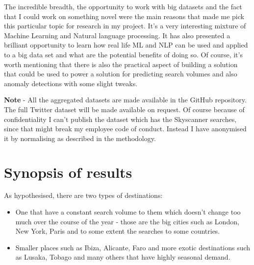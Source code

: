 \documentclass[minf,frontabs,twoside,singlespacing,parskip]{infthesis}
\begin{document}
The incredible breadth, the opportunity to work with big datasets and the fact that I could work on something novel were the main reasons that made me pick this particular topic for research in my project. It's a very interesting mixture of Machine Learning and Natural language processing. It has also presented a brilliant opportunity to learn how real life ML and NLP can be used and applied to a big data set and what are the potential benefits of doing so. Of course, it's worth mentioning that there is also the practical aspect of building a solution that could be used to power a solution for predicting search volumes and also anomaly detections with some slight tweaks. 


\textbf{Note} - All the aggregated datasets are made available in the GitHub repository. \cite{code} The full Twitter dataset will be made available on request. Of course because of confidentiality I can't publish the dataset which has the Skyscanner searches, since that might break my employee code of conduct. Instead I have anonymised it by normalising as described in the methodology. 


%
%

\section{Synopsis of results}


As hypothesised, there are two types of destinations:


\begin{itemize}
\item One that have a constant search volume to them which doesn't change too much over the course of the year - those are the big cities such as London, New York, Paris and to some extent the searches to some countries. 
\item Smaller places such as Ibiza, Alicante, Faro and more exotic destinations such as Lusaka, Tobago and many others that have highly seasonal demand.
\end{itemize}
\end{document}
